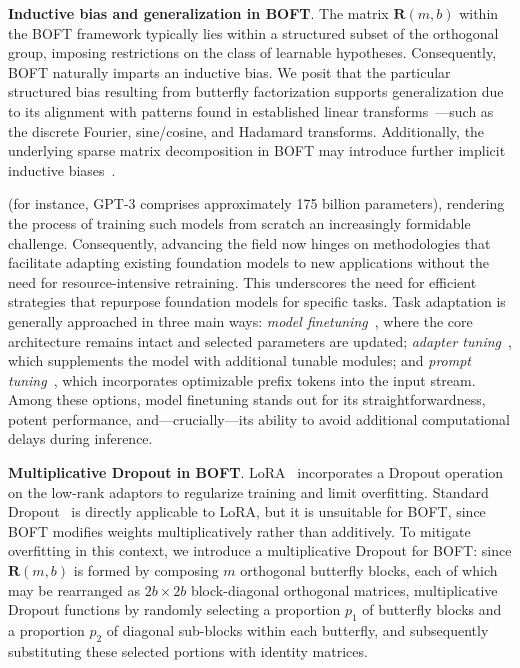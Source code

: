 

\textbf{Inductive bias and generalization in BOFT}. The matrix $\bm{R}(m,b)$ within the BOFT framework typically lies within a structured subset of the orthogonal group, imposing restrictions on the class of learnable hypotheses. Consequently, BOFT naturally imparts an inductive bias. We posit that the particular structured bias resulting from butterfly factorization supports generalization due to its alignment with patterns found in established linear transforms~\cite{dao2019kaleidoscope}—such as the discrete Fourier, sine/cosine, and Hadamard transforms. Additionally, the underlying sparse matrix decomposition in BOFT may introduce further implicit inductive biases~\cite{gunasekar2017implicit,li2018algorithmic,liu2019neural}.

(for instance, GPT-3 comprises approximately 175 billion parameters), rendering the process of training such models from scratch an increasingly formidable challenge. Consequently, advancing the field now hinges on methodologies that facilitate adapting existing foundation models to new applications without the need for resource-intensive retraining. This underscores the need for efficient strategies that repurpose foundation models for specific tasks. Task adaptation is generally approached in three main ways: \emph{model finetuning}~\cite{hulora2022,zaken2022bitfit,guo2020parameter,raffel2020exploring,qiu2023controlling,zhang2022adaptive,chavan2023one}, where the core architecture remains intact and selected parameters are updated; \emph{adapter tuning}~\cite{rebuffi2017learning,houlsby2019parameter,pfeiffer2020adapterfusion,lin2020exploring,he2021towards}, which supplements the model with additional tunable modules; and \emph{prompt tuning}~\cite{li2021prefix,lester2021power}, which incorporates optimizable prefix tokens into the input stream. Among these options, model finetuning stands out for its straightforwardness, potent performance, and—crucially—its ability to avoid additional computational delays during inference.

\textbf{Multiplicative Dropout in BOFT}. LoRA~\cite{hulora2022} incorporates a Dropout operation on the low-rank adaptors to regularize training and limit overfitting. Standard Dropout~\cite{srivastava2014dropout} is directly applicable to LoRA, but it is unsuitable for BOFT, since BOFT modifies weights multiplicatively rather than additively. To mitigate overfitting in this context, we introduce a multiplicative Dropout for BOFT: since $\bm{R}(m,b)$ is formed by composing $m$ orthogonal butterfly blocks, each of which may be rearranged as $2b\times 2b$ block-diagonal orthogonal matrices, multiplicative Dropout functions by randomly selecting a proportion $p_1$ of butterfly blocks and a proportion $p_2$ of diagonal sub-blocks within each butterfly, and subsequently substituting these selected portions with identity matrices.



